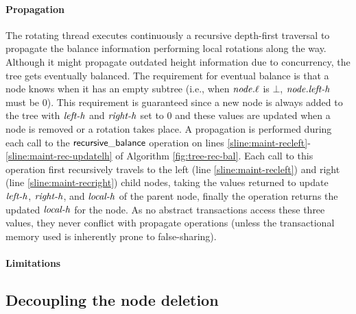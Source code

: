 \paragraph{Propagation}
The rotating thread executes continuously a recursive depth-first traversal to propagate the balance information performing local rotations
along the way.
Although it might propagate outdated height information due to concurrency, the tree gets eventually balanced.
The requirement for eventual balance is that a node knows when it has an empty subtree (i.e., when $\ms{node.\ell}$ is $\bot$, $\ms{node.left-h}$ must be $0$).
This requirement is guaranteed since a new node is always added to the tree with $\ms{left-h}$ and $\ms{right-h}$ set to $0$
and these values are updated when 
a node is removed or a rotation takes place.
A propagation is performed during each call to the $\act{recursive\_balance}$ operation on lines \ref{sline:maint-recleft}-\ref{sline:maint-rec-updatelh} of Algorithm \ref{fig:tree-rec-bal}.
Each call to this operation
first recursively travels to the left (line \ref{sline:maint-recleft}) and right (line \ref{sline:maint-recright}) child nodes, taking the values returned to update
$\ms{left-h}$, $\ms{right-h}$, and $\ms{local-h}$ of the parent node, finally the operation returns the updated $\ms{local-h}$ for the node.
As no abstract transactions access these three values, they never conflict with propagate operations (unless the transactional 
memory used is inherently prone to false-sharing).

\paragraph{Limitations}


\subsection{Decoupling the node deletion}

